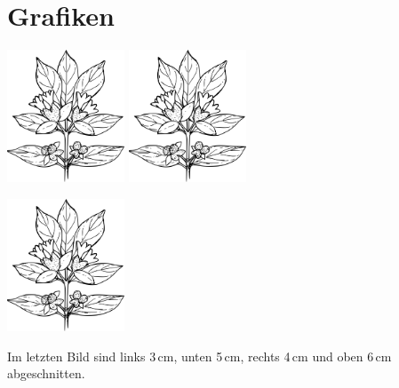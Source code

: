 \documentclass{scrartcl}
\begin{document}
  \section{Grafiken}

  \includegraphics[width=3.5cm]{flower}
  \includegraphics[width=3.5cm,angle=45]{flower}

  \includegraphics[width=3.5cm,trim=3cm 5cm 4cm 6cm,clip=true]{flower}

  Im letzten Bild sind links 3\,cm, unten 5\,cm, rechts 4\,cm und oben 6\,cm abgeschnitten.
\end{document}
